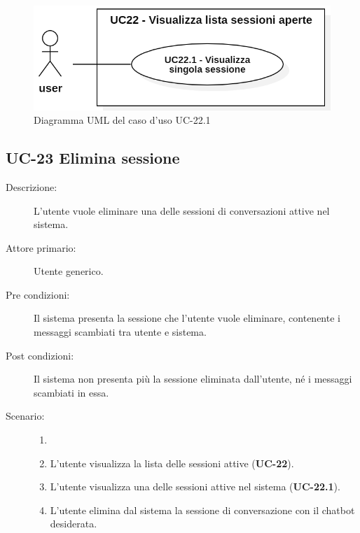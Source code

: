 \begin{figure}[H]
    \centering
    \includegraphics[width=0.8\linewidth]{UC22.1.PNG}
    \caption{Diagramma UML del caso d'uso UC-22.1}
\end{figure}

\subsection{UC-23 Elimina sessione}
\begin{description}
    \item[Descrizione:] L'utente vuole eliminare una delle sessioni di conversazioni attive nel sistema.
    \item[Attore primario:] Utente generico.
    \item[Pre condizioni:] Il sistema presenta la sessione che l'utente vuole eliminare, contenente i messaggi scambiati tra utente e sistema.
    \item[Post condizioni:] Il sistema non presenta più la sessione eliminata dall'utente, né i messaggi scambiati in essa.
    \item[Scenario:] 
    \begin{enumerate}
        \item[]
        \item L'utente visualizza la lista delle sessioni attive (\textbf{UC-22}).
        \item L'utente visualizza una delle sessioni attive nel sistema (\textbf{UC-22.1}).
        \item L'utente elimina dal sistema la sessione di conversazione con il chatbot desiderata.
    \end{enumerate}
\end{description}

